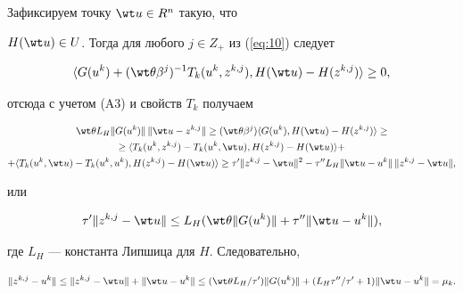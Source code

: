 \begin{pf}


Зафиксируем точку $\wt u \in R^{n}$ такую, что 


$H(\wt u) \in U$. Тогда для любого $j \in Z_{+}$ из (\ref{eq:10}) следует 


$$


\langle G(u^{k})+(\wt \theta \beta ^{j})^{-1} T_{k}(u^{k}, z^{k,j}), 


H(\wt u) - H(z^{k,j}) \rangle \geq 0,


$$


отсюда с учетом (A3) и свойств $T_{k}$ получаем


\begin{multline*}


\wt \theta L_{H} \| G(u^{k}) \|\, \|\wt u - z^{k,j}\| \geq 


(\wt \theta \beta^{j}) \langle G(u^{k}), H(\wt u) - H(z^{k,j}) \rangle


\geq \\


\ge \langle T_{k}(u^{k}, z^{k,j}) - T_{k}(u^{k}, \wt u),


H(z^{k,j}) - H(\wt u) \rangle+\\


%


+\langle T_{k}(u^{k}, \wt u) - T_{k}(u^{k}, u^{k}),


H(z^{k,j}) - H(\wt u) \rangle 


\geq \tau' \| z^{k,j} - \wt u \|^{2} - \tau'' L_{H} \|\wt u -


u^{k}\|\, \| z^{k,j} - \wt u \|, 


\end{multline*}


или 


$$


\tau' \| z^{k,j} - \wt u \| \leq L_{H}(\wt \theta \| G(u^{k}) \|+


\tau'' \|\wt u - u^{k}\|),


$$


где $L_{H}$ --- константа Липшица для $H$. Следовательно, 


\begin{equation}\label{eq:14}


\| z^{k,j} - u^{k} \| \leq \| z^{k,j} - \wt u \|+\|\wt u - u^{k}\|


\leq(\wt \theta L_{H} / \tau') \| G(u^{k}) \|+(L_{H} \tau'' / \tau'+1) 


\|\wt u - u^{k}\|=\mu_{k}. 



\end{equation}
\end{pf}
